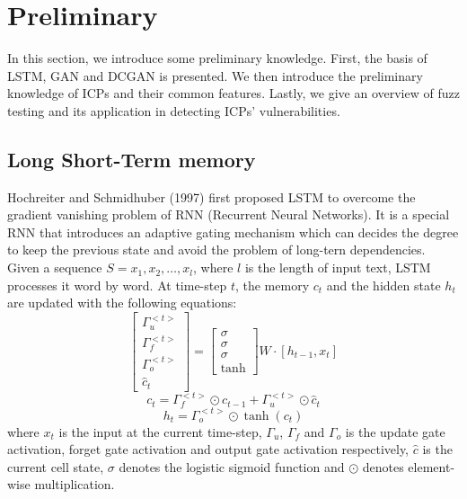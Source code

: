 \section{Preliminary}
In this section, we introduce some preliminary knowledge. First, the basis of LSTM, GAN and DCGAN is presented.  We then introduce the preliminary knowledge of ICPs and their common features. Lastly, we give an overview of fuzz testing and its application in detecting ICPs' vulnerabilities.

\subsection{Long Short-Term memory}
Hochreiter and Schmidhuber (1997) first proposed LSTM to overcome the gradient vanishing problem of RNN (Recurrent Neural Networks). It is a special RNN that introduces an adaptive gating mechanism which can decides the degree to keep the previous state and avoid the problem of long-tern dependencies. Given a sequence $S = {{x_1}, {x_2}, …, {x_l}}$, where $l$ is the length of input text, LSTM processes it word by word. At time-step $t$, the memory $c_{t}$ and the hidden state $h_{t}$ are updated with the following equations:
\begin{equation}
\left[ \begin{array}{c}
\Gamma _u^{ < t > }\\
\Gamma _f^{ < t > }\\
\Gamma _o^{ < t > }\\
{{\hat c}_t}
\end{array} \right] = \left[ \begin{array}{c}
\sigma \\
\sigma \\
\sigma \\
\tanh 
\end{array} \right]W \cdot \left[ {{h_{t - 1}},{x_t}} \right]
\end{equation}
\begin{equation}
{c_t} = \Gamma _f^{ < t > } \odot {c_{t - 1}} + \Gamma _u^{ < t > } \odot {\hat c_t}
\end{equation}
\begin{equation}
{h_t} = \Gamma _o^{ < t > } \odot \tanh ({c_t})
\end{equation}
where $x_{t}$ is the input at the current time-step, $\Gamma _u$, $\Gamma _f$ and $\Gamma _o$ is the update gate activation, forget gate activation and output gate activation respectively, $\hat{c}$ is the current cell state, $\sigma$ denotes the logistic sigmoid function and $\odot$ denotes element-wise multiplication.

